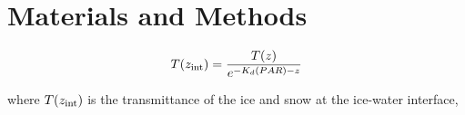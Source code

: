 \section{Materials and Methods}

\begin{linenomath*}
\begin{equation}
    T(z_\textnormal{int}) = \frac{T(z)}{e^{-K_d(PAR)-z}}
\end{equation}

\noindent where $T(z_\textnormal{int})$ is the transmittance of the ice and snow at the ice-water interface, 

\end{linenomath*}